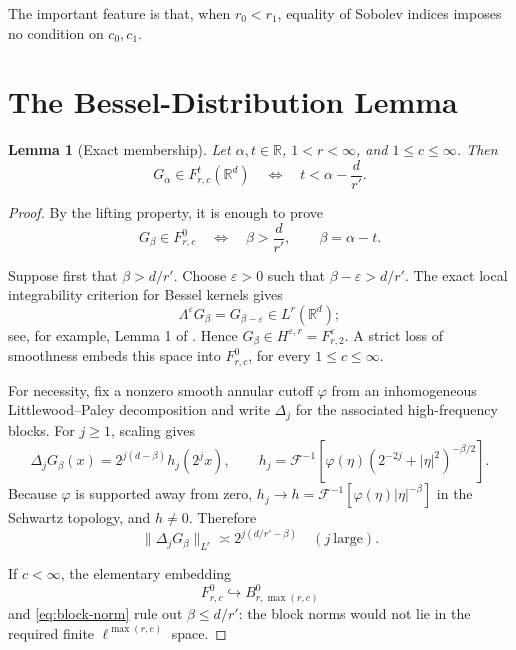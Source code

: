 \documentclass[11pt]{article}
\newtheorem{lemma}{Lemma}
\newcommand{\R}{\mathbb R}
\newcommand{\Fsp}[3]{F^{#1}_{#2,#3}}
\newcommand{\Bsp}[3]{B^{#1}_{#2,#3}}
\newcommand{\Lambdaop}{\Lambda}
\begin{document}
The important feature is that, when $r_0<r_1$, equality of Sobolev
indices imposes no condition on $c_0,c_1$.

\section*{The Bessel-Distribution Lemma}

\begin{lemma}[Exact membership]
\label{lem:bessel-membership}
Let $\alpha,t\in\R$, $1<r<\infty$, and
$1\leq c\leq\infty$.  Then
\[
  G_\alpha\in\Fsp{t}{r}{c}(\R^d)
  \quad\Longleftrightarrow\quad
  t<\alpha-\frac d{r'}.
\]
\end{lemma}

\begin{proof}
By the lifting property, it is enough to prove
\[
  G_\beta\in\Fsp{0}{r}{c}
  \quad\Longleftrightarrow\quad
  \beta>\frac d{r'},
  \qquad \beta=\alpha-t.
\]

Suppose first that $\beta>d/r'$.  Choose $\varepsilon>0$ such that
$\beta-\varepsilon>d/r'$.  The exact local integrability criterion for
Bessel kernels gives
\[
  \Lambdaop^\varepsilon G_\beta=G_{\beta-\varepsilon}
  \in L^r(\R^d);
\]
see, for example, Lemma 1 of \cite{Heeringa}.  Hence
$G_\beta\in H^{\varepsilon,r}=\Fsp{\varepsilon}{r}{2}$.
A strict loss of smoothness embeds this space into
$\Fsp{0}{r}{c}$, for every $1\leq c\leq\infty$.

For necessity, fix a nonzero smooth annular cutoff $\varphi$ from an
inhomogeneous Littlewood--Paley decomposition and write $\Delta_j$ for
the associated high-frequency blocks.  For $j\geq1$, scaling gives
\begin{equation}
  \Delta_jG_\beta(x)
  =2^{j(d-\beta)}h_j(2^jx),
  \qquad
  h_j=\mathcal F^{-1}\!\left[
    \varphi(\eta)(2^{-2j}+|\eta|^2)^{-\beta/2}
  \right].
  \label{eq:block-scaling}
\end{equation}
Because $\varphi$ is supported away from zero,
$h_j\to h=\mathcal F^{-1}[\varphi(\eta)|\eta|^{-\beta}]$ in the
Schwartz topology, and $h\neq0$.  Therefore
\begin{equation}
  \|\Delta_jG_\beta\|_{L^r}
  \asymp 2^{j(d/r'-\beta)}
  \quad (j\ \text{large}).
  \label{eq:block-norm}
\end{equation}

If $c<\infty$, the elementary embedding
\[
  \Fsp{0}{r}{c}\hookrightarrow
  \Bsp{0}{r}{\max(r,c)}
\]
and \eqref{eq:block-norm} rule out $\beta\leq d/r'$: the block norms
would not lie in the required finite $\ell^{\max(r,c)}$ space.


\end{proof}
\end{document}
